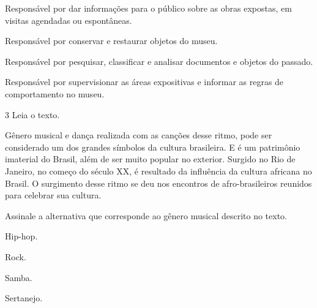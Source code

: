 \begin{escolha}
\item
  Responsável por dar informações para o público sobre as obras
  expostas, em visitas agendadas ou espontâneas.
\item
  Responsável por conservar e restaurar objetos do museu.
\item
  Responsável por pesquisar, classificar e analisar documentos e objetos
  do passado.
\item
  Responsável por supervisionar as áreas expositivas e informar as
  regras de comportamento no museu.
\end{escolha}


\num{3}  Leia o texto.

Gênero musical e dança realizada com as canções desse ritmo, pode ser considerado um dos
grandes símbolos da cultura brasileira. E é um patrimônio imaterial do Brasil, além de
ser muito popular no exterior. Surgido no Rio de Janeiro, no começo do século XX, é
resultado da influência da cultura africana no Brasil. O surgimento desse ritmo se deu
nos encontros de afro-brasileiros reunidos para celebrar sua cultura.

Assinale a alternativa que corresponde ao gênero musical descrito no texto.

\begin{minipage}{.5\textwidth}
\begin{escolha}
\item
  Hip-hop.
\item
  Rock.
\item
  Samba.
\item
  Sertanejo.
\end{escolha}
\end{minipage}

